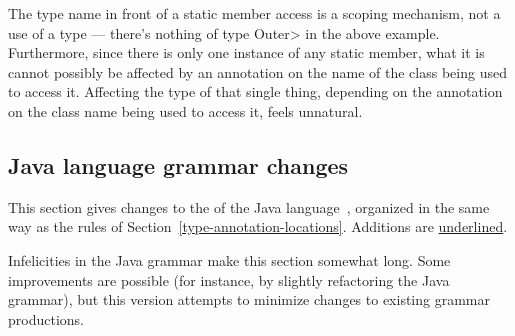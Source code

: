 \documentclass[10pt]{article}
\begin{document}
The type name in front of a static member access is a scoping mechanism,
not a use of a type --- there's nothing of type \<Outer> in the above
example.  Furthermore, since there is only one instance of any static
member, what it is cannot possibly be affected by an annotation on the name of
the class being used to access it.  Affecting the type of that single
thing, depending on the annotation on the class name being used to access
it, feels unnatural.


\subsection{Java language grammar changes\label{grammar}}

This section
gives changes to the  of the Java
language~\cite[ch.~18]{GoslingJSBB2011}, organized in the same way as
the rules of Section~\ref{type-annotation-locations}.
Additions are \underline{underlined}.

Infelicities in the Java grammar make this section somewhat long.
Some improvements are
possible (for instance, by slightly refactoring the Java grammar), but this
version attempts to minimize changes to existing grammar productions.





\newcommand{\term}[1]{\code{#1}}         %
\newcommand{\nt}[1]{\emph{#1}}           %
\newcommand{\opt}[1]{\emph{[}#1\emph{]}} %
\newcommand{\multi}[1]{\emph{\{}#1\emph{\}}} %
\newcommand{\alt}[1]{\emph{(}#1\emph{)}} %
\newcommand{\altor}[1]{\ensuremath{\mathit{|}}} %
\newcommand{\new}[1]{\underline{#1}}     %

\newcommand{\basictypename}{\alt{ \term{byte} \altor{} \term{short} \altor{} \term{char} \altor{} \term{int} \altor{} \term{long} \altor{} \term{float} \altor{} \term{double} \altor{} \term{boolean} }}
\end{document}
